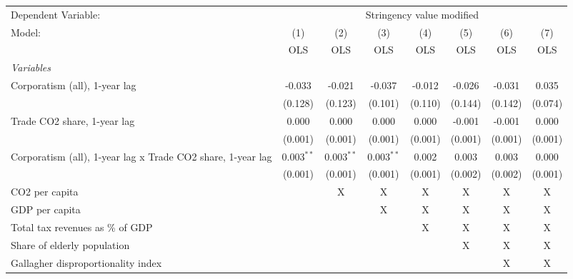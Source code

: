 
\begingroup
\centering
\begin{tabular}{lccccccc}
   \toprule
   Dependent Variable: & \multicolumn{7}{c}{Stringency value modified}\\
   Model:                                                      & (1)          & (2)          & (3)          & (4)     & (5)     & (6)     & (7)\\  
                                                               &  OLS         & OLS          & OLS          & OLS     & OLS     & OLS     & OLS\\  
   \midrule
   \emph{Variables}\\
   Corporatism (all), 1-year lag                               & -0.033       & -0.021       & -0.037       & -0.012  & -0.026  & -0.031  & 0.035\\   
                                                               & (0.128)      & (0.123)      & (0.101)      & (0.110) & (0.144) & (0.142) & (0.074)\\   
   Trade CO2 share, 1-year lag                                 & 0.000        & 0.000        & 0.000        & 0.000   & -0.001  & -0.001  & 0.000\\   
                                                               & (0.001)      & (0.001)      & (0.001)      & (0.001) & (0.001) & (0.001) & (0.001)\\   
   Corporatism (all), 1-year lag x Trade CO2 share, 1-year lag & 0.003$^{**}$ & 0.003$^{**}$ & 0.003$^{**}$ & 0.002   & 0.003   & 0.003   & 0.000\\   
                                                               & (0.001)      & (0.001)      & (0.001)      & (0.001) & (0.002) & (0.002) & (0.001)\\   
   CO2 per capita                                              &              & X            & X            & X       & X       & X       & X\\  
   GDP per capita                                              &              &              & X            & X       & X       & X       & X\\  
   Total tax revenues as \% of GDP                             &              &              &              & X       & X       & X       & X\\  
   Share of elderly population                                 &              &              &              &         & X       & X       & X\\  
   Gallagher disproportionality index                          &              &              &              &         &         & X       & X\\  

\end{tabular}
